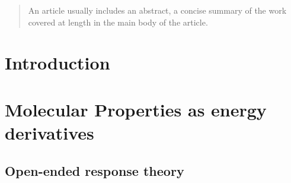 \documentclass[%
 reprint,
 amsmath,amssymb,
 aps,
]{revtex4-1}
\begin{document}
\begin{abstract}
An article usually includes an abstract, a concise summary of the work
covered at length in the main body of the article. 
\end{abstract}

\maketitle


\section{\label{sec:intro}Introduction}


\section{\label{sec:MolProp}Molecular Properties as energy derivatives}
\subsection{Open-ended response theory}
\label{rsp_theory}
\end{document}

